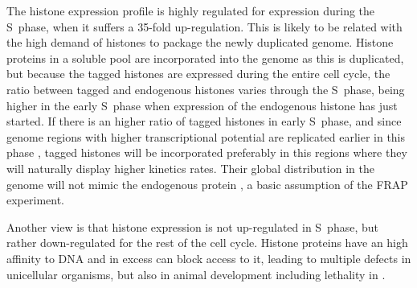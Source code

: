 
      The histone expression profile is highly regulated
      for expression during the S~phase, when it suffers a 35-fold
      up-regulation. This is likely to be related with the high
      demand of histones to package the newly duplicated genome.
      Histone proteins in a soluble pool are incorporated into the
      genome as this is duplicated, but because the tagged histones are
      expressed during the entire cell cycle, the ratio between tagged and
      endogenous histones varies through the S~phase, being higher in the
      early S~phase when expression of the endogenous histone has just started.
      If there is an higher
      ratio of tagged histones in early S~phase, and since genome regions with
      higher transcriptional potential are replicated earlier in this phase
      \citep{DNA-replication-timing}, tagged histones will be incorporated
      preferably in this regions where they will naturally display higher kinetics
      rates. Their global distribution in the genome will not
      mimic the endogenous protein \citep{KimuraCook}, a basic assumption of
      the FRAP experiment.

      Another view is that histone expression is not up-regulated in
      S~phase, but rather down-regulated for the rest of the cell cycle.
      Histone proteins have an high affinity to DNA and in excess
      can block access to it, leading to multiple defects in unicellular
      organisms, but also in animal development including lethality in 
      \citep{excess-histone, regulated-histone-proteolysis, drosophila-excess-histone1,
      drosophila-excess-histone2}.

